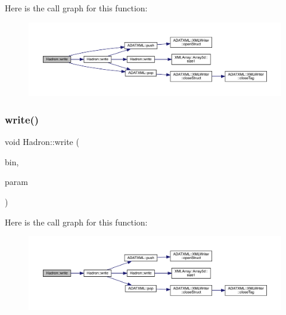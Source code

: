 Here is the call graph for this function\+:
\nopagebreak
\begin{figure}[H]
\begin{center}
\leavevmode
\includegraphics[width=350pt]{d1/daf/namespaceHadron_ae327bbb04efa053f7be135b73bb596a7_cgraph}
\end{center}
\end{figure}
\mbox{\label{namespaceHadron_a0051134178fb8346e89720a478b8a8f1}} 
\subsubsection{\texorpdfstring{write()}{write()}\hspace{0.1cm}{\footnotesize\ttfamily [8/95]}}
{\footnotesize\ttfamily void Hadron\+::write (\begin{DoxyParamCaption}\item[{\mbox{\hyperlink{classADATIO_1_1BinaryWriter}{Binary\+Writer}} \&}]{bin,  }\item[{const \mbox{\hyperlink{structHadron_1_1HadronNptType__t}{Hadron\+Npt\+Type\+\_\+t}} \&}]{param }\end{DoxyParamCaption})}

Here is the call graph for this function\+:
\nopagebreak
\begin{figure}[H]
\begin{center}
\leavevmode
\includegraphics[width=350pt]{d1/daf/namespaceHadron_a0051134178fb8346e89720a478b8a8f1_cgraph}
\end{center}
\end{figure}
\mbox{\label{namespaceHadron_aa23076bfdc2f1ebd99330197de102a6d}} 
